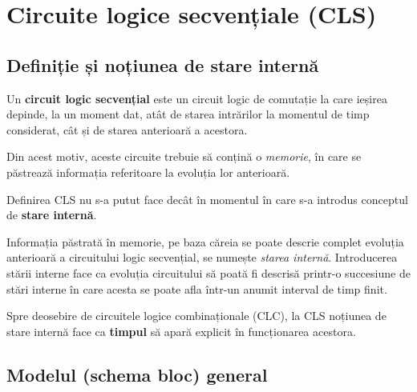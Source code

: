 \chapter{Circuite logice secvențiale (CLS)}

\section{Definiție și noțiunea de stare internă}

\begin{definitie}
Un \textbf{circuit logic secvențial} este un circuit logic de comutație la care
ieșirea depinde, la un moment dat, atât de starea intrărilor la momentul de timp
considerat, cât și de starea anterioară a acestora.
\end{definitie}

Din acest motiv, aceste circuite trebuie să conțină o \emph{memorie}, în care se
păstrează informația referitoare la evoluția lor anterioară.

Definirea CLS nu s-a putut face decât în momentul în care s-a introdus conceptul
de \textbf{stare internă}.

Informația păstrată în memorie, pe baza căreia se poate descrie complet evoluția
anterioară a circuitului logic secvențial, se numește \emph{starea internă}.
Introducerea stării interne face ca evoluția circuitului să poată fi descrisă
printr-o succesiune de stări interne în care acesta se poate afla într-un anumit
interval de timp finit.

Spre deosebire de circuitele logice combinaționale (CLC), la CLS noțiunea de
stare internă face ca \textbf{timpul} să apară explicit în funcționarea acestora.

\section{Modelul (schema bloc) general}


